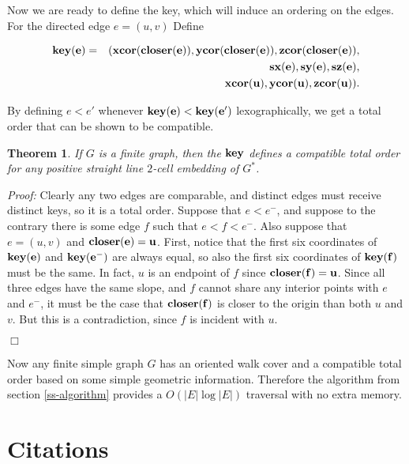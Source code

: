 \documentclass[11pt]{article}
\newcommand{\key}{\bf key}
\newcommand{\closer}{\bf closer}
\newcommand{\xcor}{\bf xcor}
\newcommand{\ycor}{\bf ycor}
\newcommand{\zcor}{\bf zcor}
\newcommand{\sx}{\bf sx}
\newcommand{\sy}{\bf sy}
\newcommand{\sz}{\bf sz}
\newtheorem{theorem}{Theorem}[section]
\begin{document}
Now we are ready to define the key, which will induce an ordering on the edges.  For 
the directed edge $e=(u,v)$ Define 

\begin{eqnarray*}
\key(e) =& &(\xcor(\closer(e)),\ycor(\closer(e)),\zcor(\closer(e)),\\
& &\sx(e),\sy(e),\sz(e),\\
& &\xcor(u),\ycor(u),\zcor(u)).
\end{eqnarray*}

By defining $e<e'$ whenever $\key(e)<\key(e')$ lexographically, we get a total order that 
can be shown to be compatible.

\begin{theorem}
If $G$ is a finite graph, then the $\key$ defines a compatible total order for any 
positive straight line $2$-cell embedding of $G^*$.  
\end{theorem}

\emph{Proof: }  Clearly any two edges are comparable, and distinct edges must 
receive distinct keys, so it is a total order.  Suppose that $e < e^-$, and suppose to the contrary 
there is some edge $f$ such that $e<f<e^-$.  Also suppose that $e=(u,v)$ and 
$\closer(e)=u$.  First, notice that the first six coordinates 
of $\key(e)$ and $\key(e^-)$ are always equal, so also the first six coordinates of $\key(f)$ must 
be the same.  In fact, $u$ is an endpoint of $f$ since $\closer(f)=u$.  Since all three edges have the 
same slope, and $f$ cannot share any interior points with $e$ and $e^-$, it must be the case that 
$\closer(f)$ is closer to the origin than both $u$ and $v$.  But this is a contradiction, since $f$ is 
incident with $u$.  \begin{flushright} $\Box$\end{flushright}


Now any finite simple graph $G$ has an oriented walk cover and a compatible total order based on 
some simple geometric information.  Therefore the algorithm from section \ref{ss-algorithm} 
provides a $O(|E|\log|E|)$ traversal with no extra memory.



\section{Citations}

\end{document}
